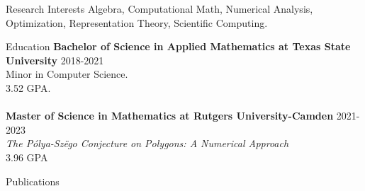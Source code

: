\documentclass{resume} %
\begin{document}


\begin{rSection}{Research Interests}
Algebra, Computational Math, Numerical Analysis, Optimization, Representation Theory, Scientific Computing.


\end{rSection}

\begin{rSection}{Education}
{\bf Bachelor of Science in Applied Mathematics at Texas State University} \hfill {2018-2021}
\\ 
Minor in Computer Science.
\\
3.52 GPA.
\\
\\
{\bf Master of Science in Mathematics at Rutgers University-Camden} \hfill {2021-2023}
\\
\textit{The Pólya-Sz\"ego Conjecture on Polygons: A Numerical Approach}
\\
3.96 GPA

\end{rSection}

\begin{rSection}{Publications}
  \item {}
\end{rSection}



\end{document}
